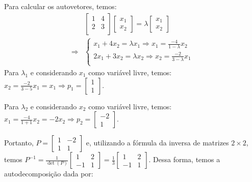 \documentclass[a4paper,12pt]{article}
\begin{document}
\begin{enumerate}
    Para calcular os autovetores, temos:
    \begin{align*}
    &\begin{bmatrix}
        1 & 4\\
        2 & 3\\
    \end{bmatrix} \begin{bmatrix}
        x_1\\x_2
    \end{bmatrix} = \lambda \begin{bmatrix}
        x_1\\x_2
    \end{bmatrix}\\
    \Rightarrow & \begin{cases}
        x_1 + 4 x_2 = \lambda x_1 \Rightarrow x_1 = \frac{-4 }{1-\lambda}x_2\\
        2 x_1 + 3 x_2 = \lambda x_2  \Rightarrow x_2 = \frac{-2 }{3-\lambda}x_1 \\
    \end{cases}
    \end{align*}
    Para $\lambda_1$ e considerando $x_1$ como variável livre, temos: $x_2 = \frac{-2}{3-5} x_1= x_1 \Rightarrow p_1 = \begin{bmatrix}
        1 \\ 1
    \end{bmatrix}$.

    Para $\lambda_2$ e considerando $x_2$ como variável livre, temos: $x_1 =\frac{-4 }{1+1} x_2= -2 x_2 \Rightarrow p_2 = \begin{bmatrix}
        -2 \\ 1
    \end{bmatrix}$.

    Portanto, $P = \begin{bmatrix}
        1 & -2 \\
        1 & 1
    \end{bmatrix}$ e, utilizando a fórmula da inversa de matrizes $2\times 2$, temos $P^{-1} = \frac{1}{\det(P)} \begin{bmatrix}
        1 & 2\\
        -1 & 1
    \end{bmatrix} = \frac{1}{3} \begin{bmatrix}
        1 & 2\\
        -1 & 1
    \end{bmatrix}$. Dessa forma, temos a autodecomposição dada por:


\end{enumerate}
\end{document}
